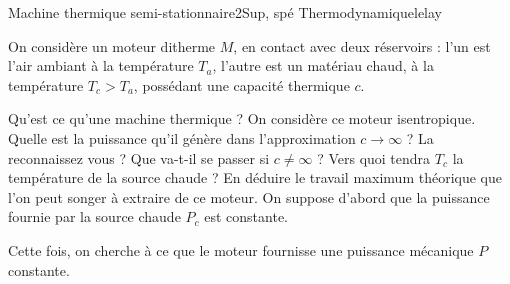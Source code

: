 \begin{exercise}{Machine thermique semi-stationnaire}{2}{Sup, spé}
{Thermodynamique}{lelay}

On considère un moteur ditherme $M$, en contact avec deux réservoirs : l'un est l'air ambiant à la température $T_a$, l'autre est un matériau chaud, à la température $T_c > T_a$, possédant une capacité thermique $c$.

\begin{questions}
    \questioncours Qu'est ce qu'une machine thermique ?
    \question On considère ce moteur isentropique. Quelle est la puissance qu'il génère dans l'approximation $c \longrightarrow \infty$ ? La reconnaissez vous ?
    \question Que va-t-il se passer si $c \neq \infty$ ? Vers quoi tendra $T_c$ la température de la source chaude ? En déduire le travail maximum théorique que l'on peut songer à extraire de ce moteur.
    \question On suppose d'abord que la puissance fournie par la source chaude $P_c$ est constante.
    \question Cette fois, on cherche à ce que le moteur fournisse une puissance mécanique $P$ constante.
\end{questions}
\end{exercise}
